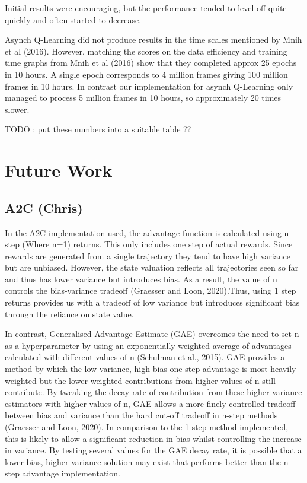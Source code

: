 \documentclass{article}
\begin{document}
Initial results were encouraging, but the performance tended to level off quite quickly and often started to decrease.

Asynch Q-Learning did not produce results in the time scales mentioned by Mnih et al (2016).
However, matching the scores on the data efficiency and training time graphs from Mnih et al (2016) show that they completed approx 25 epochs in 10 hours.
A single epoch corresponds to 4 million frames giving 100 million frames in 10 hours.
In contrast our implementation for asynch Q-Learning only managed to process 5 million frames in 10 hours, so approximately 20 times slower.

TODO : put these numbers into a suitable table ??

\section{Future Work}


\subsection{A2C (Chris)}

In the A2C implementation used, the advantage function is calculated using n-step (Where n=1) returns. This only includes one step of actual rewards. Since rewards are generated from a single trajectory they tend to have high variance but are unbiased. However, the state valuation reflects all trajectories seen so far and thus has lower variance but introduces bias. As a result, the value of n controls the bias-variance tradeoff (Graesser and Loon, 2020).Thus, using 1 step returns provides us with a tradeoff of low variance but introduces significant bias through the reliance on state value.

In contrast, Generalised Advantage Estimate (GAE) overcomes the need to set n as a hyperparameter by using an exponentially-weighted average of advantages calculated with different values of n (Schulman et al., 2015). GAE provides a  method by which the low-variance, high-bias one step advantage is most heavily weighted but the lower-weighted contributions from higher values of n still contribute. By tweaking the decay rate of contribution from these higher-variance estimators with higher values of n, GAE allows a more finely controlled tradeoff between bias and variance than the hard cut-off tradeoff in n-step methods (Graesser and Loon, 2020). In comparison to the 1-step method implemented, this is likely to allow a significant reduction in bias whilst controlling the increase in variance. By testing several values for the GAE decay rate, it is possible that a lower-bias, higher-variance solution may exist that performs better than the n-step advantage implementation.
\end{document}
